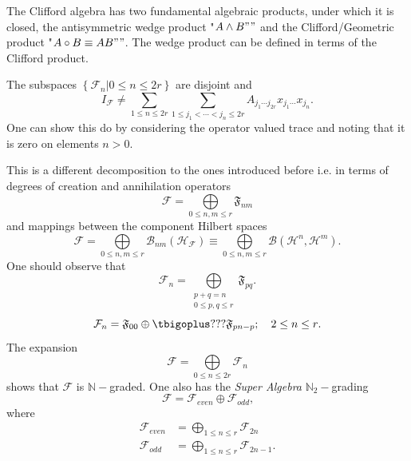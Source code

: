 \documentclass[aps, preprint]{revtex4}
\begin{document}
The Clifford algebra has two fundamental algebraic products, under which it is closed, the antisymmetric wedge
product "$A \wedge B ""$ and the Clifford/Geometric product "$A \circ B \equiv A B ""$. The wedge product can be defined in terms of the Clifford product. 

The subspaces $\left \{\left .\mathcal{F}_{n}\right \vert 0 \leq n \leq 2 r\right \}$ are disjoint and
\begin{equation*}I_{\mathcal{F}} \neq \sum _{1 \leq n \leq 2 r}\sum _{1 \leq j_{1} <\cdots  <j_{n} \leq 2 r}A_{j_{1} \cdots  j_{2 r}} x_{j_{1} \cdots } x_{j_{n}}\text{.}
\end{equation*}One can show this do by considering the operator valued trace and noting that it is zero on elements $n >0.\;$ 

This is a different decomposition to the ones introduced before i.e. in terms of degrees of creation and annihilation
operators
\begin{equation}\mathcal{F} =\underset{0 \leq n ,m \leq r}{\bigoplus }\mathfrak{F}_{n m}
\end{equation}and mappings between the component Hilbert spaces
\begin{equation}\mathcal{F} =\underset{0 \leq n ,m \leq r}{\bigoplus }\mathcal{B}_{n m} \left (\mathcal{H}_{\mathcal{F}}\right ) \equiv \underset{0 \leq n ,m \leq r}{\bigoplus }\mathcal{B} \left (\mathcal{H}^{n} ,\mathcal{H}^{m}\right )\text{.}
\end{equation}One should observe that
\begin{equation}\mathcal{F}_{n} =\underset{\begin{array}{c}p +q =n \\
0 \leq p ,q \leq r\end{array}}{\bigoplus }\mathfrak{F}_{p q}\text{.}
\end{equation}
\begin{equation}\mathcal{F}_{n} =\mathfrak{F}_{0 0} \oplus \tbigoplus ???\mathfrak{F}_{p n -p} ;\text{\quad }2 \leq n \leq r\text{.}
\end{equation}The expansion
\begin{equation}\mathcal{F} =\underset{0 \leq n \leq 2 r}{\bigoplus }\mathcal{F}_{n}
\end{equation}shows that $\mathcal{F}$ is $\mathbb{N} -$graded. One also has the \emph{Super Algebra }$\mathbb{N}_{2} -$grading
\begin{equation}\mathcal{F} =\mathcal{F}_{e v e n} \oplus \mathcal{F}_{o d d}\text{,}
\end{equation}where
\begin{align}\mathcal{F}_{e v e n} &  =\underset{1 \leq n \leq r}{\bigoplus }\mathcal{F}_{2 n} \\
\mathcal{F}_{o d d} &  =\underset{1 \leq n \leq r}{\bigoplus }\mathcal{F}_{2 n -1}\text{.}\end{align}
\end{document}
